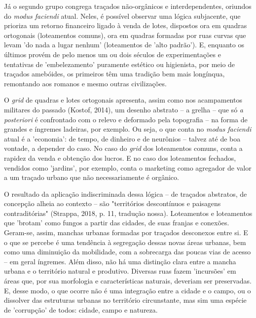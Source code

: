 \documentclass[]{report}
\begin{document}
	Já o segundo grupo congrega traçados não-orgânicos e interdependentes, oriundos do \textit{modus faciendi} atual. Neles, é possível observar uma lógica subjacente, que prioriza um retorno financeiro ligado à venda de lotes, dispostos ora em quadras ortogonais (loteamentos comuns), ora em quadras formadas por ruas curvas que levam 'do nada a lugar nenhum' (loteamentos de 'alto padrão'). E, enquanto os últimos provém de pelo menos um ou dois séculos de experimentações e tentativas de 'embelezamento' puramente estético ou higienista, por meio de traçados amebóides, os primeiros têm uma tradição bem mais longínqua, remontando aos romanos e mesmo outras civilizações. 

	O \textit{grid} de quadras e lotes ortogonais apresenta, assim como nos acampamentos militares do passado (Kostof, 2014), um desenho abstrato – a grelha – que só \textit{a posteriori} é confrontado com o relevo e deformado pela topografia – na forma de grandes e íngremes ladeiras, por exemplo. Ou seja, o que conta no \textit{modus faciendi} atual é a 'economia': de tempo, de dinheiro e de neurônios – talvez até de boa vontade, a depender do caso. No caso do \textit{grid} dos loteamentos comuns, conta a rapidez da venda e obtenção dos lucros. E no caso dos loteamentos fechados, vendidos como 'jardins', por exemplo, conta o marketing como agregador de valor a um traçado urbano que não necessariamente é orgânico.

	O resultado da aplicação indiscriminada dessa lógica – de traçados abstratos, de concepção alheia ao contexto – são "territórios descontínuos e paisagens contraditórias" (Strappa, 2018, p. 11, tradução nossa). Loteamentos e loteamentos que 'brotam' como fungos a partir das cidades, de suas franjas e conexões. Geram-se, assim, manchas urbanas formadas por traçados desconexos entre si. E o que se percebe é uma tendência à segregação dessas novas áreas urbanas, bem como uma diminuição da mobilidade, com a sobrecarga das poucas vias de acesso – em geral íngremes.
	Além disso, não há uma distinção clara entre a mancha urbana e o território natural e produtivo. Diversas ruas fazem 'incursões' em áreas que, por sua morfologia e características naturais, deveriam ser preservadas. E, desse modo, o que ocorre não é uma integração entre a cidade e o campo, ou o dissolver das estruturas urbanas no território circunstante, mas sim uma espécie de 'corrupção' de todos: cidade, campo e natureza.
\end{document}
